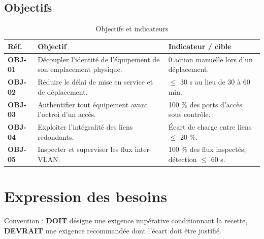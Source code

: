 \documentclass[11pt,a4paper]{article}
\newcommand{\rid}[1]{\textcolor{primary}{\textbf{\small #1}}}
\begin{document}
\subsection{Objectifs}
\begin{table}[H]
\centering
\caption{Objectifs et indicateurs}
\begin{tabularx}{\textwidth}{L{1.4cm} Y L{4.6cm}}
\toprule
{}\textbf{Réf.} & \textbf{Objectif} & \textbf{Indicateur / cible} \\
\midrule
\rid{OBJ-01} & Découpler l'identité de l'équipement de son emplacement physique. & 0 action manuelle lors d'un déplacement. \\
\rid{OBJ-02} & Réduire le délai de mise en service et de déplacement. & $\leq$ 30 s au lieu de 30 à 60 min. \\
\rid{OBJ-03} & Authentifier tout équipement avant l'octroi d'un accès. & 100 \% des ports d'accès sous contrôle. \\
\rid{OBJ-04} & Exploiter l'intégralité des liens redondants. & Écart de charge entre liens $\leq$ 20 \%. \\
\rid{OBJ-05} & Inspecter et superviser les flux inter-VLAN. & 100 \% des flux inspectés, détection $\leq$ 60 s. \\
\bottomrule
\end{tabularx}
\end{table}

\section{Expression des besoins}
Convention : \textbf{DOIT} désigne une exigence impérative conditionnant la recette, \textbf{DEVRAIT} une exigence recommandée dont l'écart doit être justifié.
\end{document}

